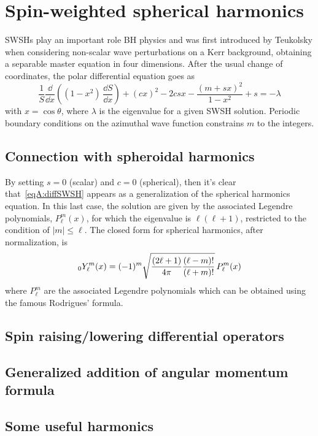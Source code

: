 
\label{AppendixA} %
\chapter{Spin-weighted spherical harmonics} %

SWSHs play an important role BH physics and was first introduced by Teukolsky when considering non-scalar wave perturbations on a Kerr background, obtaining a separable master equation in four dimensions. After the usual change of coordinates, the polar differential equation goes as 
\begin{equation}
	\frac{1}{S} \frac{\dd}{\dd x} \left( (1-x^2) \, \frac{\dd S}{\dd x} \right) + (c x)^2 - 2 c s x  -\frac{(m + s x)^2}{1 - x^2} + s  = - \lambda
\label{eqA:diffSWSH}
\end{equation}
with $x=\cos\theta$, where $\lambda$ is the eigenvalue for a given SWSH solution. Periodic boundary conditions on the azimuthal wave function constrains $m$ to the integers.   

\section{Connection with spheroidal harmonics}

By setting $s=0$ (scalar) and $c=0$ (spherical), then it's clear that~\eqref{eqA:diffSWSH} appears as a generalization of the spherical harmonics equation. In this last case, the solution are given by the associated Legendre polynomials, $P^m_\ell (x)$, for which the eigenvalue is $\ell(\ell+1)$, restricted to the condition of $|m| \le \ell$. The closed form for spherical harmonics, after normalization, is
\begin{equation}
	\sts[0]{Y^m}{\ell}(x)= (-1)^{m} \sqrt{\frac{(2\ell +1)}{4\pi} \frac{(\ell -m)!}{(\ell +m)!}} \, P_\ell^m (x)
\label{eqA:SH}
\end{equation}
where $P_{\ell}^{m}$ are the associated Legendre polynomials which can be obtained using the famous Rodrigues' formula.

\section{Spin raising/lowering differential operators}

\section{Generalized addition of angular momentum formula}

\section{Some useful harmonics}